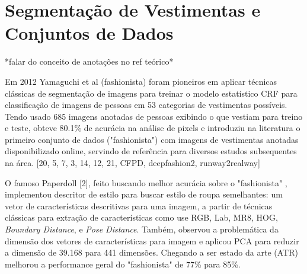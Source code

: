 \documentclass[12pt]{report}
\begin{document}

\section{Segmentação de Vestimentas e Conjuntos de Dados}

*falar do conceito de anotações no ref teórico* 




Em 2012 Yamaguchi et al (fashionista) foram pioneiros em aplicar técnicas clássicas de segmentação de imagens para treinar o modelo estatístico CRF para classificação de imagens de pessoas em 53 categorias de vestimentas possíveis. Tendo usado 685 imagens anotadas de pessoas exibindo o que vestiam para treino e teste, obteve 80.1\% de acurácia na análise de pixels e introduziu na literatura o primeiro conjunto de dados ("fashionista") com imagens de vestimentas anotadas disponibilizado online, servindo de referência para diversos estudos subsequentes na área. [20, 5, 7, 3, 14, 12, 21, CFPD, deepfashion2, runway2realway]


O famoso Paperdoll [2], feito buscando melhor acurácia sobre o "fashionista" , implementou descritor de estilo para buscar estilo de roupa semelhantes: um vetor de características descritivas para uma imagem, a partir de técnicas clássicas para extração de características como use RGB, Lab, MR8, HOG, \textit{Boundary Distance}, e \textit{Pose Distance}. Também, observou a problemática da dimensão dos vetores de características para imagem e aplicou PCA para reduzir a dimensão de 39.168 para 441 dimensões. Chegando a ser estado da arte (ATR) melhorou a performance geral do "fashionista" de 77\% para 85\%.
\end{document}
